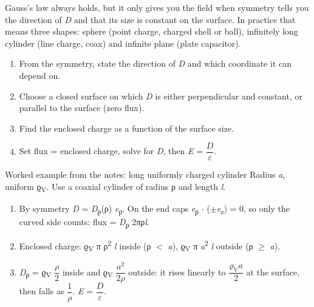 \documentclass[11pt]{article}
\begin{document}
\begin{keepsection}
\begin{keepsection}
Gauss’s law always holds, but it only gives you the field when symmetry tells you the direction of \textit{D} and that its size is constant on the surface. In practice that means three shapes: sphere (point charge, charged shell or ball), infinitely long cylinder (line charge, coax) and infinite plane (plate capacitor).

\begin{enumerate}
\item From the symmetry, state the direction of \textit{D} and which coordinate it can depend on.
\item Choose a closed surface on which \textit{D} is either perpendicular and constant, or parallel to the surface (zero flux).
\item Find the enclosed charge as a function of the surface size.
\item Set flux = enclosed charge, solve for \textit{D}, then \textit{E} = {\small\ensuremath{\dfrac{{D}}{ε}}}.
\end{enumerate}

\begin{workedbox}{Worked example from the notes: long uniformly charged cylinder}
Radius \textit{a}, uniform ϱ\textsubscript{V}. Use a coaxial cylinder of radius ρ and length \textit{l}.

\begin{enumerate}
\item By symmetry \textit{D} = \textit{D}\textsubscript{ρ}(ρ) \textit{e}\textsubscript{ρ}. On the end caps \textit{e}\textsubscript{ρ} \ensuremath{\cdot} (\ensuremath{\pm}\textit{e}\textsubscript{z}) = 0, so only the curved side counts: flux = \textit{D}\textsubscript{ρ} 2πρ\textit{l}.
\item Enclosed charge: ϱ\textsubscript{V} π ρ\textsuperscript{2} \textit{l} inside (ρ \ensuremath{<} \textit{a}), ϱ\textsubscript{V} π \textit{a}\textsuperscript{2} \textit{l} outside (ρ \ensuremath{\geq} \textit{a}).
\item \textit{D}\textsubscript{ρ} = ϱ\textsubscript{V} {\small\ensuremath{\dfrac{ρ}{2}}} inside and ϱ\textsubscript{V} {\small\ensuremath{\dfrac{{a}^{2}}{2ρ}}} outside: it rises linearly to {\small\ensuremath{\dfrac{ϱ_{\mathrm{V}}{a}}{2}}} at the surface, then falls as {\small\ensuremath{\dfrac{1}{ρ}}}. \textit{E} = {\small\ensuremath{\dfrac{{D}}{ε}}}.
\end{enumerate}
\end{workedbox}


\end{keepsection}
\end{keepsection}
\end{document}
